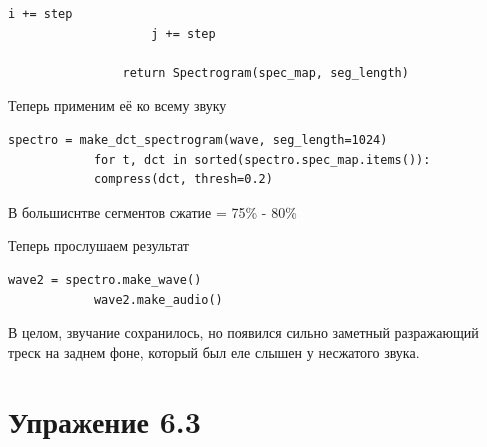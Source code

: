 \documentclass[a4paper,12pt]{article}
\begin{document}
\begin{enumerate}
\begin{lstlisting}[caption=Функция \texttt{make\_dct\_spectrogram()}]
					i += step
					j += step
				
				return Spectrogram(spec_map, seg_length)
		\end{lstlisting}
		
		Теперь применим её ко всему звуку
		\begin{lstlisting}[caption=Применяем \texttt{make\_dct\_spectrogram()}]
			spectro = make_dct_spectrogram(wave, seg_length=1024)
			for t, dct in sorted(spectro.spec_map.items()):
			compress(dct, thresh=0.2)
		\end{lstlisting}
		
		В большиснтве сегментов сжатие = 75\% - 80\%
		
		Теперь прослушаем результат
		\begin{lstlisting}[caption=Воспроизводим сжатый звук]
			wave2 = spectro.make_wave()
			wave2.make_audio()
		\end{lstlisting}
		
		В целом, звучание сохранилось, но появился сильно заметный разражающий треск на заднем фоне, который был еле слышен у несжатого звука.
		
	
	\end{enumerate}
	\newpage
		
		
	\section {Упражение 6.3}
		
\end{document}
